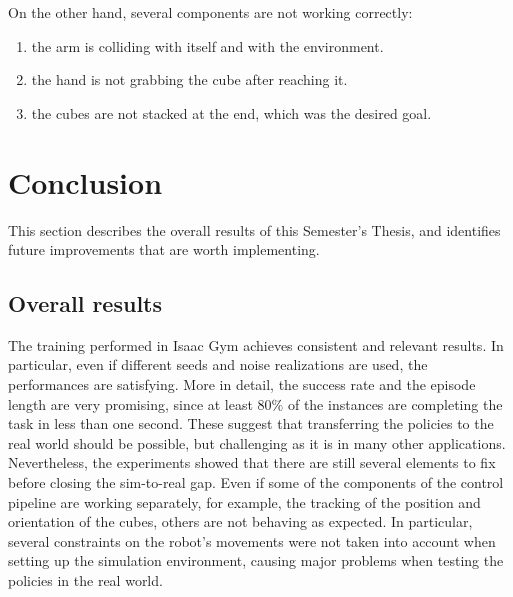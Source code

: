 \documentclass[a4paper]{article}
\begin{document}
On the other hand, several components are not working correctly:
\begin{enumerate}
    \item the arm is colliding with itself and with the environment.
    \item the hand is not grabbing the cube after reaching it.
    \item the cubes are not stacked at the end, which was the desired goal.
\end{enumerate}

\newpage

\section{Conclusion}
This section describes the overall results of this Semester's Thesis, and identifies future improvements that are worth implementing.

\subsection{Overall results}
The training performed in Isaac Gym achieves consistent and relevant results. In particular, even if different seeds and noise realizations are used, the performances are satisfying. More in detail, the success rate and the episode length are very promising, since at least $80\%$ of the instances are completing the task in less than one second. These suggest that transferring the policies to the real world should be possible, but challenging as it is in many other applications.\\
Nevertheless, the experiments showed that there are still several elements to fix before closing the sim-to-real gap. Even if some of the components of the control pipeline are working separately, for example, the tracking of the position and orientation of the cubes, others are not behaving as expected. In particular, several constraints on the robot's movements were not taken into account when setting up the simulation environment, causing major problems when testing the policies in the real world.
\end{document}
